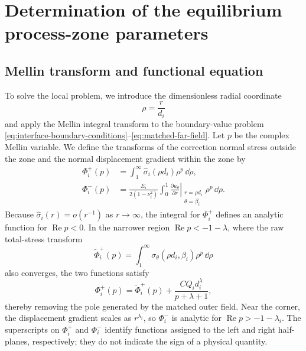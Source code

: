 \section{Determination of the equilibrium process-zone parameters}
\label{sec:derivation}

\subsection{Mellin transform and functional equation}
\label{subsec:mellin}

To solve the local problem, we introduce the dimensionless radial coordinate
\begin{equation*}
  \rho=\frac{r}{d_i}
\end{equation*}
and apply the Mellin integral transform to the boundary-value problem
\eqref{eq:interface-boundary-conditions}--\eqref{eq:matched-far-field}.
Let $p$ be the complex Mellin variable. We define the transforms of the
correction normal stress outside the zone and the normal displacement
gradient within the zone by
\begin{equation*}
\begin{aligned}
  \Phi_i^+(p)
    &=\int_1^\infty
      \widehat{\sigma}_i(\rho d_i)\rho^p\,\dd\rho,\\
  \Phi_i^-(p)
    &=\frac{E_i}{2(1-\nu_i^2)}
      \int_0^1
      \left.
      \frac{\partial u_\theta}{\partial r}
      \right|_{\substack{r=\rho d_i\\\theta=\beta_i}}
      \rho^p\,\dd\rho.
\end{aligned}
\end{equation*}
Because $\widehat{\sigma}_i(r)=o(r^{-1})$ as $r\to\infty$, the integral
for $\Phi_i^+$ defines an analytic function for
$\operatorname{Re}p<0$. In the narrower region
$\operatorname{Re}p<-1-\lambda$, where the raw total-stress transform
\begin{equation*}
  \widetilde{\Phi}_i^+(p)
  =\int_1^\infty
    \sigma_\theta(\rho d_i,\beta_i)\rho^p\,\dd\rho
\end{equation*}
also converges, the two functions satisfy
\begin{equation*}
  \Phi_i^+(p)
  =\widetilde{\Phi}_i^+(p)
   +\frac{CQ_i d_i^\lambda}{p+\lambda+1},
\end{equation*}
thereby removing the pole generated by the matched outer field. Near the
corner, the displacement gradient scales as $r^{\lambda_i}$, so
$\Phi_i^-$ is analytic for $\operatorname{Re}p>-1-\lambda_i$. The superscripts on $\Phi_i^+$ and
$\Phi_i^-$ identify functions assigned to the left and right half-planes,
respectively; they do not indicate the sign of a physical quantity.

